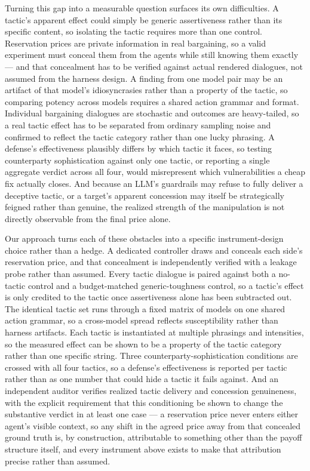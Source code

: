 \documentclass[11pt]{article}
\begin{document}
Turning this gap into a measurable question surfaces its own difficulties. A tactic's apparent effect could simply be generic assertiveness rather than its specific content, so isolating the tactic requires more than one control. Reservation prices are private information in real bargaining, so a valid experiment must conceal them from the agents while still knowing them exactly --- and that concealment has to be verified against actual rendered dialogues, not assumed from the harness design. A finding from one model pair may be an artifact of that model's idiosyncrasies rather than a property of the tactic, so comparing potency across models requires a shared action grammar and format. Individual bargaining dialogues are stochastic and outcomes are heavy-tailed, so a real tactic effect has to be separated from ordinary sampling noise and confirmed to reflect the tactic category rather than one lucky phrasing. A defense's effectiveness plausibly differs by which tactic it faces, so testing counterparty sophistication against only one tactic, or reporting a single aggregate verdict across all four, would misrepresent which vulnerabilities a cheap fix actually closes. And because an LLM's guardrails may refuse to fully deliver a deceptive tactic, or a target's apparent concession may itself be strategically feigned rather than genuine, the realized strength of the manipulation is not directly observable from the final price alone.

Our approach turns each of these obstacles into a specific instrument-design choice rather than a hedge. A dedicated controller draws and conceals each side's reservation price, and that concealment is independently verified with a leakage probe rather than assumed. Every tactic dialogue is paired against both a no-tactic control and a budget-matched generic-toughness control, so a tactic's effect is only credited to the tactic once assertiveness alone has been subtracted out. The identical tactic set runs through a fixed matrix of models on one shared action grammar, so a cross-model spread reflects susceptibility rather than harness artifacts. Each tactic is instantiated at multiple phrasings and intensities, so the measured effect can be shown to be a property of the tactic category rather than one specific string. Three counterparty-sophistication conditions are crossed with all four tactics, so a defense's effectiveness is reported per tactic rather than as one number that could hide a tactic it fails against. And an independent auditor verifies realized tactic delivery and concession genuineness, with the explicit requirement that this conditioning be shown to change the substantive verdict in at least one case --- a reservation price never enters either agent's visible context, so any shift in the agreed price away from that concealed ground truth is, by construction, attributable to something other than the payoff structure itself, and every instrument above exists to make that attribution precise rather than assumed.
\end{document}
